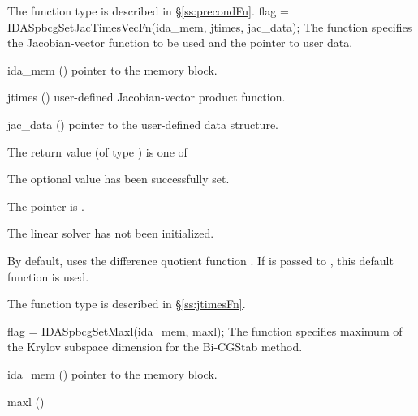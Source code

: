 {{   The function type  is described in \S\ref{ss:precondFn}.
}
{
  flag = IDASpbcgSetJacTimesVecFn(ida\_mem, jtimes, jac\_data);
}
{
  The function  specifies the Jacobian-vector 
  function to be used and the pointer to user data.
}
{
  \begin{args}
  \item[ida\_mem] ()
    pointer to the {\ida} memory block.
  \item[jtimes] ()
    user-defined Jacobian-vector product function.
  \item[jac\_data] ()
     pointer to the user-defined data structure.
  \end{args}
}
{
  The return value  (of type ) is one of
  \begin{args}
  \item[\Id{IDASPBCG\_SUCCESS}] 
    The optional value has been successfully set.
  \item[\Id{IDASPBCG\_MEM\_NULL}]
    The  pointer is .
  \item[\Id{IDASPBCG\_LMEM\_NULL}]
    The {\idaspbcg} linear solver has not been initialized.
  \end{args}
}
{
  By default, {\idaspbcg} uses the difference quotient function .
  If  is passed to , this default function is used.

  The function type  is described in \S\ref{ss:jtimesFn}.
}
{
  flag = IDASpbcgSetMaxl(ida\_mem, maxl);
}
{
  The function  specifies maximum of the Krylov subspace
  dimension for the Bi-CGStab method.
}
{
  \begin{args}
  \item[ida\_mem] ()
    pointer to the {\ida} memory block.
  \item[maxl] ()


\end{args}}}
